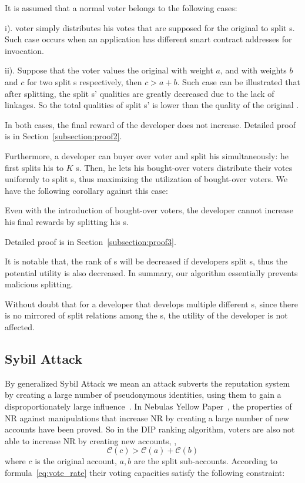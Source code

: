 It is assumed that a normal voter belongs to the following cases:
\begin{inparaenum}
\item[i).] voter simply distributes his votes that are supposed for the original \dapp to split {\dapp}s. Such case occurs when an application has different smart contract addresses for invocation.
\item[ii).] Suppose that the voter values the original \dapp with weight $a$, and with weights $b$ and $c$ for two split {\dapp}s respectively, then $c>a+b$. Such case can be illustrated that after splitting, the split {\dapp}s' qualities are greatly decreased due to the lack of linkages. So the total qualities of split {\dapp}s' is lower than the quality of the original \dapp.
 \end{inparaenum}

  In both cases, the final reward of the developer does not increase. Detailed
  proof is in Section~\ref{subsection:proof2}.

Furthermore, a developer can buyer over voter and split his \dapp simultaneously: he first splits his \dapp to $K$ {\dapp}s. Then, he lets his bought-over voters distribute their votes uniformly to split {\dapp}s, thus  maximizing the utilization of  bought-over  voters. We have the following corollary against this case:

\begin{corollary}
	\label{c1}
	Even with the introduction of bought-over voters, the developer cannot increase his final rewards by splitting his {\dapp}s.
\end{corollary}

Detailed proof is in Section~\ref{subsection:proof3}.

It is notable that, the rank of {\dapp}s will be decreased if developers split {\dapp}s, thus the potential utility is also decreased. In summary, our algorithm essentially prevents malicious splitting.

Without doubt that for a developer that develops multiple different  {\dapp}s,
since there is no mirrored of split relations among the {\dapp}s, the utility of
the developer is not affected.

\subsection{Sybil Attack}
\noindent By generalized Sybil Attack we mean an attack subverts the reputation system by creating a large number of pseudonymous identities, using them to gain a disproportionately large influence~\cite{quercia2010sybil}. In Nebulas Yellow Paper~\cite{Nebulasyellowpaper}, the properties of NR against manipulations that increase NR by creating a large number of new accounts have been proved. So in the DIP ranking algorithm, voters are also not able to increase NR by creating new accounts, \ie,
$$\mathcal{C}(c)>\mathcal{C}(a)+\mathcal{C}(b)$$
where $c$ is the original account, $a,b$ are the split sub-accounts. According to formula~\ref{eq:vote_rate} their voting capacities satisfy the following constraint:

